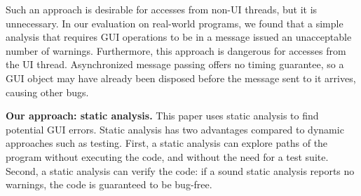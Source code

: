 Such an approach is desirable for accesses from non-UI threads, but it is unnecessary.
In our evaluation on real-world programs, we found that a simple analysis that
requires GUI operations to be in a message issued
an unacceptable number of warnings. %
Furthermore, this approach is dangerous for accesses from the UI thread. Asynchronized message passing offers
no timing guarantee, so a GUI object may have already been
disposed before the message sent to it arrives, causing other bugs. 




\smallskip

\textbf{Our approach: static analysis.}
This paper uses static analysis to find potential GUI errors.
Static analysis has two advantages compared to dynamic approaches such as
 testing. First, a static analysis can explore paths of the program without
executing the code, and without the need for a test suite.
Second, a static analysis can verify the code: if a sound static analysis
reports no warnings, the code is guaranteed to be bug-free. 


